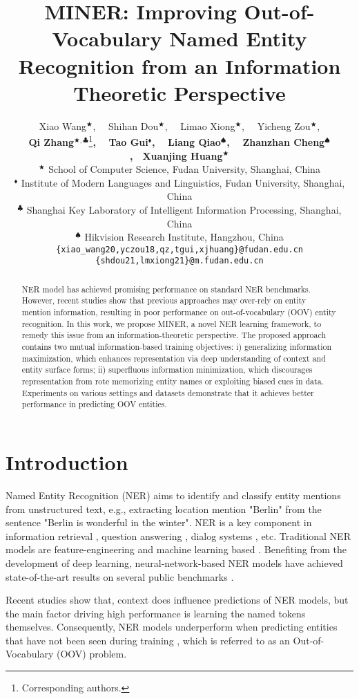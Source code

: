 \documentclass[11pt]{article}
\title{MINER: Improving Out-of-Vocabulary Named Entity Recognition from an Information Theoretic Perspective}
\author{{\normalsize
    Xiao Wang$^{\bigstar}$, \ \ Shihan Dou$^{\bigstar}$, \ \ Limao Xiong$^{\bigstar}$, \ \ Yicheng Zou$^{\bigstar}$, } \\ 
    {\normalsize \textbf{Qi Zhang}$^{\bigstar,\clubsuit}$\thanks{{ }{ }Corresponding authors.}\textbf{,} \ \ \textbf{Tao Gui}$^{\blacklozenge}$\textbf{,} \ \
    \textbf{Liang Qiao}$^{\spadesuit}$\textbf{,} \ \ \textbf{Zhanzhan Cheng}$^{\spadesuit}$\textbf{,}\ \ \textbf{Xuanjing Huang}$^{\bigstar}$ } \\
{$^\bigstar$ \normalsize School of Computer Science, Fudan University, Shanghai, China} \\
  {$^\blacklozenge$ \normalsize Institute of Modern Languages and Linguistics, Fudan University, Shanghai, China} \\
  {$^\clubsuit$ \normalsize Shanghai Key Laboratory of Intelligent Information Processing, Shanghai, China} \\
  {$^\spadesuit$ \normalsize Hikvision Research Institute, Hangzhou, China} \\
  \texttt{\normalsize \{xiao\_wang20,yczou18,qz,tgui,xjhuang\}@fudan.edu.cn}\\
  \texttt{\normalsize \{shdou21,lmxiong21\}@m.fudan.edu.cn} \\
  }
\begin{document}
\maketitle

\begin{abstract}
NER model has achieved promising performance on standard NER benchmarks. However, recent studies show that previous approaches may over-rely on entity mention information, resulting in poor performance on out-of-vocabulary (OOV) entity recognition.  In this work, we propose MINER, a novel NER learning framework, to remedy this issue from an information-theoretic perspective. The proposed approach contains two mutual information-based training objectives: i) generalizing information maximization, which enhances representation via deep understanding of context and entity surface forms; ii) superfluous information minimization, which discourages representation from rote memorizing entity names or exploiting biased cues in data. Experiments on various settings and datasets demonstrate that it achieves better performance in predicting OOV entities.

\end{abstract}

\section{Introduction}

Named Entity Recognition (NER) aims to identify and classify entity mentions from unstructured text, e.g., extracting location mention "Berlin" from the sentence "Berlin is wonderful in the winter". NER is a key component in information retrieval \cite{tan-etal-2021-extracting}, question answering \cite{min-etal-2021-joint}, dialog systems \cite{wang-etal-2020-multi-domain}, etc. Traditional NER models are feature-engineering and machine learning based \cite{zhou2002named,takeuchi2002use,agerri2016robust}. Benefiting from the development of deep learning, neural-network-based NER models have achieved state-of-the-art results on several public benchmarks \cite{lample-etal-2016-neural,peters-etal-2018-deep,devlin2018bert,yamada-etal-2020-luke,yan-etal-2021-unified-generative}.

Recent studies \cite{lin-etal-2020-rigorous,agarwal2021interpretability} show that, context does influence predictions of NER models, but the main factor driving high performance is learning the named tokens themselves. Consequently, NER models underperform when predicting entities that have not been seen during training  \cite{fu2020rethinking,lin-etal-2020-rigorous}, which is referred to as an Out-of-Vocabulary (OOV) problem. 
\end{document}
